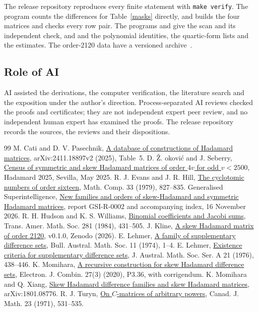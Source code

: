 \documentclass[11pt]{article}
\begin{document}
The release repository reproduces every finite statement with \texttt{make verify}. The program  counts the differences for Table~\ref{masks} directly, and  builds the four matrices and checks every row pair. The programs  and  give the scan and its independent check, and  and  the polynomial identities, the quartic-form lists and the estimates. The order-2120 data have a versioned archive~\cite{Kline}.

\subsection*{Role of AI}
AI assisted the derivations, the computer verification, the literature
search and the exposition under the author's direction. Process-separated AI
reviews checked the proofs and certificates; they are not independent expert
peer review, and no independent human expert has examined the proofs. The
release repository records the sources, the reviews and their dispositions.

\begin{thebibliography}{99}\small
{} M. Cati and D. V. Pasechnik, \href{https://arxiv.org/abs/2411.18897v2}{A database of constructions of Hadamard matrices}, arXiv:2411.18897v2 (2025), Table~5.
 D. \v{Z}. \DJ{}okovi\'c and J. Seberry, \href{https://gestioneventos.us.es/hadamard2025/participants}{Census of symmetric and skew Hadamard matrices of order $4v$ for odd $v<2500$}, Hadamard 2025, Sevilla, May 2025.
 R. J. Evans and J. R. Hill, \href{https://mathweb.ucsd.edu/~revans/Cyclotomic16.pdf}{The cyclotomic numbers of order sixteen}, Math. Comp. 33 (1979), 827--835.
 Generalised Superintelligence, \href{https://generalised.si/research/skew-symmetric-hadamard}{New families and orders of skew-Hadamard and symmetric Hadamard matrices}, report GSI-R-0002 and accompanying index, 16 November 2026.
 R. H. Hudson and K. S. Williams, \href{https://doi.org/10.1090/S0002-9947-1984-0722761-X}{Binomial coefficients and Jacobi sums}, Trans. Amer. Math. Soc. 281 (1984), 431--505.
 J. Kline, \href{https://doi.org/10.5281/zenodo.24356140}{A skew Hadamard matrix of order 2120}, v0.1.0, Zenodo (2026).
 E. Lehmer, \href{https://doi.org/10.1017/S0004972700043550}{A family of supplementary difference sets}, Bull. Austral. Math. Soc. 11 (1974), 1--4.
 E. Lehmer, \href{https://doi.org/10.1017/S1446788700019273}{Existence criteria for supplementary difference sets}, J. Austral. Math. Soc. Ser. A 21 (1976), 438--446.
 K. Momihara, \href{https://doi.org/10.37236/9058}{A recursive construction for skew Hadamard difference sets}, Electron. J. Combin. 27(3) (2020), P3.36, with corrigendum.
 K. Momihara and Q. Xiang, \href{https://arxiv.org/abs/1801.08776}{Skew Hadamard difference families and skew Hadamard matrices}, arXiv:1801.08776.
 R. J. Turyn, \href{https://doi.org/10.4153/CJM-1971-056-0}{On $C$-matrices of arbitrary powers}, Canad. J. Math. 23 (1971), 531--535.
\end{thebibliography}
\end{document}
